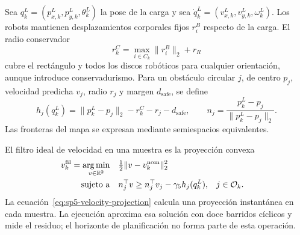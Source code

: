Sea $q_k^L=(p_{x,k}^L,p_{y,k}^L,\theta_k^L)$ la pose de la carga y sea $\dot q_k^L=(v_{x,k}^L,v_{y,k}^L,\omega_k^L)$. Los robots mantienen desplazamientos corporales fijos $r_i^B$ respecto de la carga. El radio conservador
\begin{equation}
  r_k^{C}=\max_{i\in C_k}\lVert r_i^B\rVert_2+r_R
  \label{eq:sp5-compound-radius}
\end{equation}
cubre el rectángulo y todos los discos robóticos para cualquier orientación, aunque introduce conservadurismo. Para un obstáculo circular $j$, de centro $p_j$, velocidad predicha $v_j$, radio $r_j$ y margen $d_{\mathrm{safe}}$, se define
\begin{equation}
  h_j(q_k^L)=\lVert p_k^L-p_j\rVert_2-r_k^C-r_j-d_{\mathrm{safe}},
  \qquad
  n_j=\frac{p_k^L-p_j}{\lVert p_k^L-p_j\rVert_2}.
  \label{eq:sp5-barrier}
\end{equation}
Las fronteras del mapa se expresan mediante semiespacios equivalentes.

El filtro ideal de velocidad en una muestra es la proyección convexa
\begin{equation}
\label{eq:sp5-velocity-projection}
\begin{aligned}
  v_k^{\mathrm{fil}}=\operatorname*{arg\,min}_{v\in\mathbb R^2}\quad
  & \tfrac12\lVert v-v_k^{\mathrm{nom}}\rVert_2^2\\
  \text{sujeto a}\quad
  & n_j^\top v\geq n_j^\top v_j-\gamma_5 h_j(q_k^L),
  &&j\in\mathcal O_k .
\end{aligned}
\end{equation}
La ecuación~\eqref{eq:sp5-velocity-projection} calcula una proyección instantánea en cada muestra. La ejecución aproxima esa solución con doce barridos cíclicos y mide el residuo; el horizonte de planificación no forma parte de esta operación.

